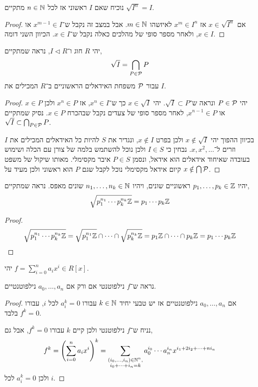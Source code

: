 \subquestion{}
נוכיח שאם $I$ ראשוני אז לכל $n \in \mathbb{N}$ מתקיים $\sqrt{I^n} = I$.
\begin{proof}
	אם $x \in \sqrt{I^n}$ אז $x^m \in I^n$ לאיזשהו $m \in \mathbb{N}$.
	אבל במצב זה נקבל ש־$x^{m - 1} \in I$ או $x \in I$, ולאחר מספר סופי של מהלכים כאלה נקבל ש־$x \in I$.
	הכיוון השני דומה.
\end{proof}

\question{}
יהי $R$ חוג ו־$I \triangleleft R$, נראה שמתקיים,
\[
	\sqrt{I}
	= \bigcap_{P \in \mathcal{P}} P
\]
עבור $\mathcal{P}$ משפחת האידאלים הראשוניים ב־$R$ המכילים את $I$.
\begin{proof}
	יהי $P \in \mathcal{P}$ ונראה ש־$\sqrt{I} \subset P$.
	יהי $x \in \sqrt{I}$ כך ש־$x^n \in I$, אז $x^n \in P$ ולכן $x \in P$ או $x^{n - 1} \in P$, לאחר מספר סופי של צעדים נקבל שבהכרח $x \in P$.
	נסיק שמתקיים $\sqrt{I} \subset \bigcap_{P \in \mathcal{P}} P$.

	בכיוון ההפוך יהי $x \notin \sqrt{I}$ ולכן בפרט $x \notin I$, ונגדיר את $S$ להיות כל האידאלים המכילים את $I$ וזרים ל־$x, x^2, \ldots$.
	נבחין כי $I \in S$ ולכן נוכל להשתמש בלמה של צורן עם הכלה ושימוש בעובדה שאיחוד אידאלים הוא אידאל, ונסמן $P \in S$ איבר מקסימלי.
	מאותו שיקול של משפט קיום אידאל מקסימלי נוכל לקבל שגם $P$ הוא ראשוני ולכן מעיד על $x \notin \bigcap \mathcal{P}$.
\end{proof}

\question{}
יהיו $p_1, \ldots, p_k \in \mathbb{Z}$ ראשוניים שונים, ויהיו $n_1, \ldots, n_k \in \mathbb{N}$ שונים מאפס.
נראה שמתקיים,
\[
	\sqrt{p_1^{n_1} \cdots p_k^{n_k} \mathbb{Z}}
	= p_1 \cdots p_k \mathbb{Z}
\]
\begin{proof}
	\[
		\sqrt{p_1^{n_1} \cdots p_k^{n_k} \mathbb{Z}}
		= \sqrt{p_1^{n_1} \mathbb{Z}} \cap \cdots \cap \sqrt{p_k^{n_k} \mathbb{Z}}
		= p_1 \mathbb{Z} \cap \cdots \cap p_k \mathbb{Z}
		= p_1 \cdots p_k \mathbb{Z}
	\]
\end{proof}

\question{}
יהי $f = \sum_{i = 0}^n a_i x^i \in R[x]$.

\subquestion{}
נראה ש־$f$ נילפוטנטי אם ורק אם $a_0, \ldots, a_n$ נילפוטנטיים.
\begin{proof}
	אם $a_0, \ldots, a_n$ נילפוטנטיים אז יש טבעי יחיד $k \in \mathbb{N}$ עבורו $a_i^k = 0$ לכל $i$, עבורו $f^k = 0$ בלבד.

	נניח ש־$f$ נילפוטנטי ולכן קיים $k$ עבורו $f^k = 0$, אבל גם,
	\[
		f^k
		= {\left(\sum_{i = 0}^n a_i x^i\right)}^k
		= \sum_{\substack{(i_0, \ldots, i_n) \in \mathbb{N}^n, \\ i_0 + \cdots + i_n = k}} a_0^{i_0} \cdots a_n^{i_n} x^{i_1 + 2 i_2 + \cdots + n i_n}
	\]
	ולכן $a_i^k = 0$ לכל $i$.
\end{proof}

